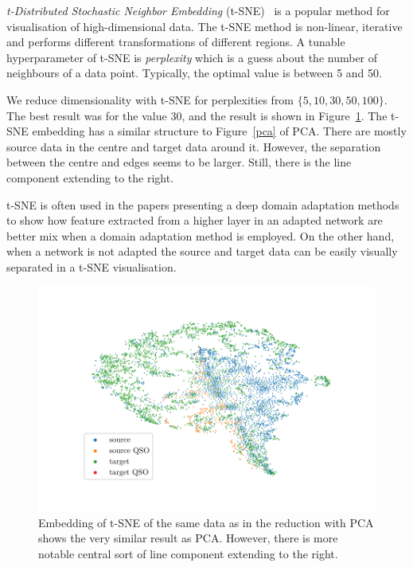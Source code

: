 \textit{t-Distributed Stochastic Neighbor Embedding} (t-SNE)~\cite{maaten2008, wattenberg2016} is a popular method for visualisation of high-dimensional data.
The t-SNE method is non-linear, iterative
and performs different transformations of different regions.
A tunable hyperparameter of t-SNE is \textit{perplexity}
which is a guess about the number of neighbours of a data point.
Typically, the optimal value is between 5 and 50.

We reduce dimensionality with t-SNE for perplexities from \(\{5, 10, 30, 50, 100\}\).
The best result was for the value 30,
and the result is shown in Figure~\ref{tsne}.
The t-SNE embedding has a similar structure to Figure~\ref{pca} of PCA.
There are mostly source data in the centre and target data around it.
However, the separation between the centre and edges seems to be larger.
Still, there is the line component extending to the right.

t-SNE is often used in the papers presenting a deep domain adaptation methods
to show how feature extracted from a higher layer in an adapted network
are better mix when a domain adaptation method is employed.
On the other hand, when a network is not adapted the source and target data
can be easily visually separated in a t-SNE visualisation.

\begin{figure}
\includegraphics[width=\textwidth]{img/tsne.pdf}
\caption[t-SNE visualisation of source and target data distributions]{
	Embedding of t-SNE of the same data
	as in the reduction with PCA shows the very similar result as PCA.
	However, there is more notable central sort of line component
	extending to the right.
	}
\label{tsne}
\end{figure}


